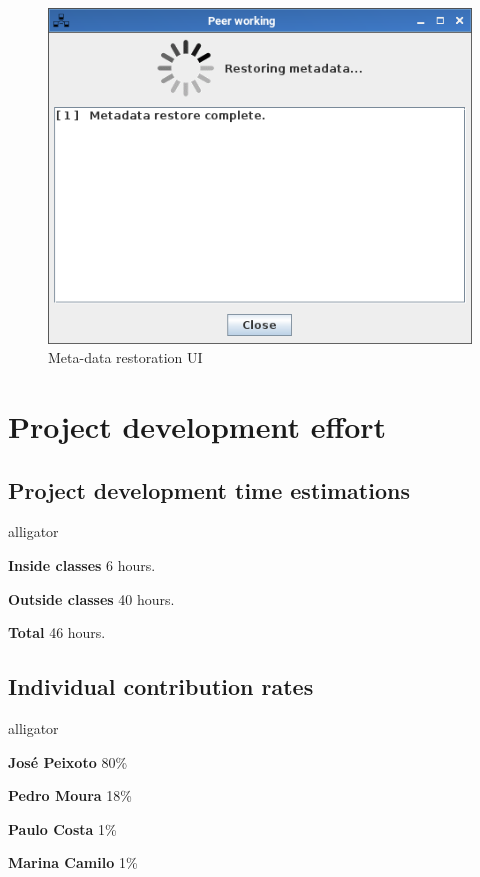 \documentclass[a4paper,11pt]{article}
\begin{document}
\begin{figure}[h]
    \centering
    \includegraphics[scale=0.40]{MetadataRestoration.png}
    \caption{Meta-data restoration UI}
    \label{fig:MetadataRestoration.png}
\end{figure}

\clearpage
\section{Project development effort}

\subsection{Project development time estimations}
\begin{labeling}{alligator}
\item [\textbf{Inside classes}] 6 hours.
\item [\textbf{Outside classes}] 40 hours.
\item [\textbf{Total}] 46 hours.
\end{labeling}

\subsection{Individual contribution rates}
\begin{labeling}{alligator}
\item [\textbf{José Peixoto}] 80\%
\item [\textbf{Pedro Moura}] 18\%
\item [\textbf{Paulo Costa}] 1\%
\item [\textbf{Marina Camilo}] 1\%
\end{labeling}
\end{document}
